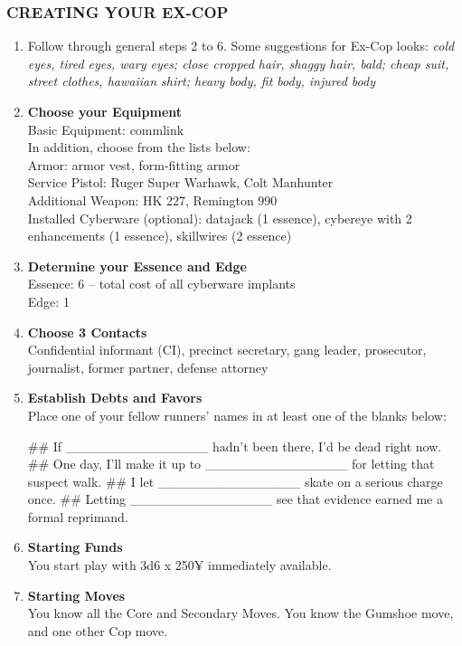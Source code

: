 \subsubsection{CREATING YOUR EX-COP}
\begin{enumerate}
    \item Follow through general steps 2 to 6. Some suggestions for Ex-Cop looks: \textit{cold eyes, tired eyes, wary eyes; close cropped hair, shaggy hair, bald; cheap suit, street clothes, hawaiian shirt; heavy body, fit body, injured body}
    
    \item \textbf{Choose your Equipment} \\
    Basic Equipment: commlink \\
    In addition, choose from the lists below: \\
        Armor: armor vest, form-fitting armor \\
        Service Pistol: Ruger Super Warhawk, Colt Manhunter \\
        Additional Weapon: HK 227, Remington 990 \\
        Installed Cyberware (optional): datajack (1 essence), cybereye with 2 enhancements (1 essence), skillwires (2 essence)
    
    \item \textbf{Determine your Essence and Edge} \\
    Essence: 6 – total cost of all cyberware implants \\
    Edge: 1
    
    \item \textbf{Choose 3 Contacts} \\
    Confidential informant (CI), precinct secretary, gang leader, prosecutor, journalist, former partner, defense attorney
    
    \item \textbf{Establish Debts and Favors} \\
    Place one of your fellow runners’ names in at least one of the blanks below:
        \begin{easylist}
            ## If \_\_\_\_\_\_\_\_\_\_\_\_\_\_\_ hadn’t been there, I’d be dead right now.
            ## One day, I’ll make it up to \_\_\_\_\_\_\_\_\_\_\_\_\_\_\_ for letting that suspect walk.
            ## I let \_\_\_\_\_\_\_\_\_\_\_\_\_\_\_ skate on a serious charge once.
            ## Letting \_\_\_\_\_\_\_\_\_\_\_\_\_\_\_ see that evidence earned me a formal reprimand.
        \end{easylist}
    
    \item \textbf{Starting Funds} \\
    You start play with 3d6 x 250¥ immediately available.
    
    \item \textbf{Starting Moves} \\
    You know all the Core and Secondary Moves.
    You know the Gumshoe move, and one other Cop move.
\end{enumerate}

